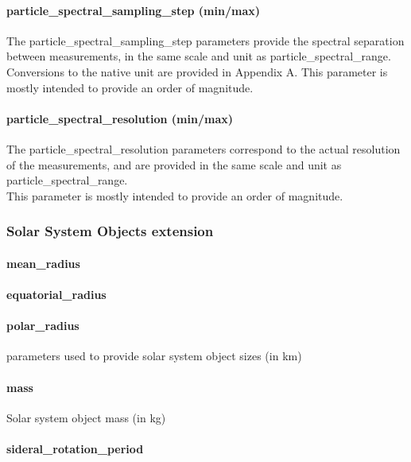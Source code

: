 \documentclass[11pt,a4paper]{ivoa}
\begin{document}
\paragraph{particle\_spectral\_sampling\_step (min/max)}

The particle\_spectral\_sampling\_step parameters provide the spectral separation between measurements, in the same scale and unit as particle\_spectral\_range.\\Conversions to the native unit are provided in Appendix A. This parameter is mostly intended to provide an order of magnitude.

\paragraph{particle\_spectral\_resolution (min/max)}

The particle\_spectral\_resolution parameters correspond to the actual resolution of the measurements, and are provided in the same scale and unit as particle\_spectral\_range. \\This parameter is mostly intended to provide an order of magnitude.

\subsubsection{Solar System Objects extension\\}

\paragraph{mean\_radius}

\paragraph{equatorial\_radius}

\paragraph{polar\_radius}

parameters used to provide solar system object sizes (in km)

\paragraph{mass}

Solar system object mass (in kg)

\paragraph{sideral\_rotation\_period}
\end{document}
